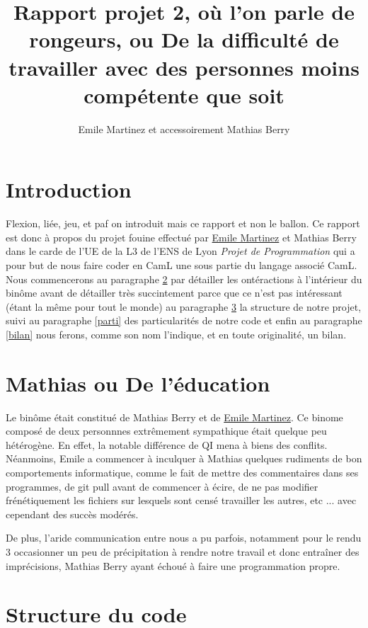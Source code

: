 \documentclass{article}
\title{Rapport projet 2, où l'on parle de rongeurs, ou De la difficulté de travailler avec des personnes moins compétente que soit}
\author{Emile Martinez et accessoirement Mathias Berry}
\date{}
\begin{document}
\maketitle

\section{Introduction}

Flexion, liée, jeu, et paf on introduit mais ce rapport et non le ballon.
\newline
Ce rapport est donc à propos du projet fouine effectué par \underline{Emile Martinez} et Mathias Berry dans le carde de l'UE de la L3 de l'ENS de Lyon \textit{Projet de Programmation} qui a pour but de nous faire coder en CamL une sous partie du langage associé  CamL. Nous commencerons au paragraphe \ref{relation} par détailler les ontéractions à l'intérieur du binôme avant de détailler très succintement parce que ce n'est pas intéressant (étant la même pour tout le monde) au paragraphe \ref{s:orga} la structure de notre projet, suivi au paragraphe \ref{parti} des particularités de notre code et enfin au paragraphe \ref{bilan} nous ferons, comme son nom l'indique, et en toute originalité, un bilan.

\section{Mathias ou De l'éducation}
\label{relation}

Le binôme était constitué de Mathias Berry et de \underline{Emile Martinez}.
\newline
Ce binome composé de deux personnnes extrêmement sympathique était quelque peu hétérogène. En effet, la notable différence de QI mena à biens des conflits. Néanmoins, Emile a commencer à inculquer à Mathias quelques rudiments de bon comportements informatique, comme le fait de mettre des commentaires dans ses programmes, de git pull avant de commencer à écire, de ne pas modifier frénétiquement les fichiers sur lesquels sont censé travailler les autres, etc ... avec cependant des succès modérés.
\newline

De plus, l'aride communication entre nous a pu parfois, notamment pour le rendu 3 occasionner un peu de précipitation à rendre notre travail et donc entraîner des imprécisions, Mathias Berry ayant échoué à faire une programmation propre.

\section{Structure du code}
\label{s:orga}
\end{document}
